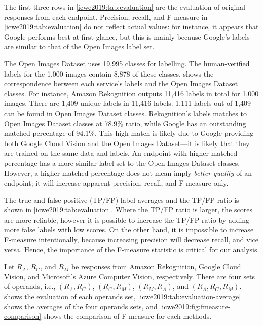 The first three rows in \cref{icwe2019:tab:evaluation} are the evaluation of original responses from each  endpoint.
Precision, recall, and F-measure in \cref{icwe2019:tab:evaluation} do not reflect actual values: for instance, it appears that Google performs best at first glance, but this is mainly because Google's labels are similar to that of the Open Images label set.

The Open Images Dataset uses 19,995 classes for labelling. The human-verified labels for the 1,000 images contain 8,878 of these classes.
 shows the correspondence between each service's labels and the Open Images Dataset classes.
For instance, Amazon Rekognition outputs 11,416 labels in total for 1,000 images.
There are 1,409 unique labels in 11,416 labels.
1,111 labels out of 1,409 can be found in Open Images Dataset classes.
Rekognition's labels matches to Open Images Dataset classes at 78.9\% ratio, while Google has an outstanding matched percentage of 94.1\%.
This high match is likely due to Google providing both Google Cloud Vision and the Open Images Dataset---it is likely that they are trained on the same data and labels.
An endpoint with higher matched percentage has a more similar label set to the Open Images Dataset classes.
However, a higher matched percentage does not mean imply \textit{better quality} of an  endpoint; it will increase apparent precision, recall, and F-measure only.

The true and false positive (TP/FP) label averages and the TP/FP ratio is shown in \cref{icwe2019:tab:evaluation}.
Where the TP/FP ratio is larger, the scores are more reliable, however it is possible to increase the TP/FP ratio by adding more false labels with low scores.
On the other hand, it is impossible to increase F-measure intentionally, because increasing precision will decrease recall, and vice versa.
Hence, the importance of the F-measure statistic is critical for our analysis.

Let $R_A$, $R_G$, and $R_M$ be responses from Amazon Rekognition, Google Cloud Vision, and Microsoft's Azure Computer Vision, respectively.
There are four sets of operands, i.e., $(R_A, R_G)$, $(R_G, R_M)$, $(R_M, R_A)$, and $(R_A, R_G, R_M)$.
 shows the evaluation of each operands set, \cref{icwe2019:tab:evaluation-average} shows the averages of the four operands sets, and \cref{icwe2019:fig:fmeasure-comparison} shows the comparison of F-measure for each methods.

